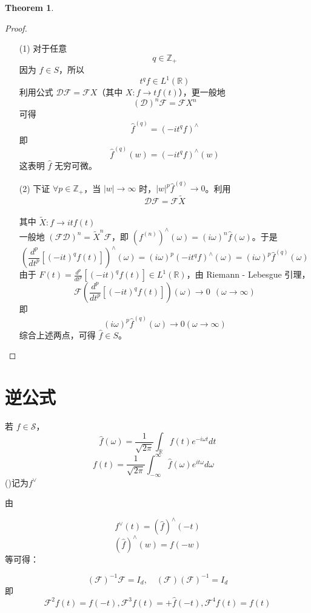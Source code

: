 \documentclass[linespread=1.5,openany]{book}%
\theoremstyle{plain}
\newtheorem{theorem}{Theorem}
\begin{document}
{\begin{theorem}
			\end{theorem}
			\begin{proof}
				\begin{itemize}	\item [(1)]对于任意 \[ q \in \mathbb{Z}_{+} \]因为 \( f \in S \)，所以 \[ t^{q}f \in L^{1}(\mathbb{R}) \]利用公式 \( \mathcal{D}\mathcal{F} = \mathcal{F}X \)（其中 \( X: f \to tf(t) \)），更一般地 \[ (\mathcal{D})^{n}\mathcal{F} = \mathcal{F}X^{n} \]可得 \[ \hat{f}^{(q)} = (-it^{q}f)^{\wedge} \]即
					\[ \hat{f}^{(q)}(w) = (-it^{q}f)^{\wedge}(w) \]
					这表明 \( \hat{f} \) 无穷可微。
					\item [(2)]	
					下证 \( \forall p \in \mathbb{Z}_{+} \)，当 \( |w| \to \infty \) 时，\( |w|^{p}\hat{f}^{(q)} \to 0 \)。利用 \[ \mathcal{D}\mathcal{F} = \mathcal{F}\tilde{X} \]\\其中 \( \tilde{X}: f \to itf(t) \)\\一般地 \( (\mathcal{F}\mathcal{D})^{n} = \tilde{X}^{n}\mathcal{F} \)，即 \( (f^{(n)})^{\wedge}(\omega) = (i\omega)^{n}\hat{f}(\omega) \)。于是 \[ \left( \frac{d^{p}}{dt^{p}}[(-it)^{q}f(t)] \right)^{\wedge}(\omega) = (i\omega)^{p}(-it^{q}f)^{\wedge}(\omega) = (i\omega)^{p}\hat{f}^{(q)}(\omega) \]
					由于 \( F(t)=\frac{d^{p}}{dt^{p}}[(-it)^{q}f(t)] \in L^{1}(\mathbb{R}) \)，由 Riemann - Lebesgue 引理，\[ \mathcal{F}\left( \frac{d^{p}}{dt^{p}}[(-it)^{q}f(t)] \right)(\omega) \to 0 \ \ (\omega \to \infty) \]即 \[ (i\omega)^{p}\hat{f}^{(q)}(\omega) \to 0( \omega \to \infty) \]综合上述两点，可得 \( \hat{f} \in S \)。
				\end{itemize}
			\end{proof}
			\section{逆公式}
			若 \( f \in 	\mathcal{S} \)，
			\[
			\hat{f}(\omega)=\frac{1}{\sqrt{2\pi}}\int_{\mathbb{R}} f(t)e^{-i\omega t}dt
			\]
			\[
			f(t)=\frac{1}{\sqrt{2\pi}}\int_{-\infty}^{\infty} \hat{f}(\omega)e^{i t \omega}d\omega \quad \]()记为$f^{\vee}$
			
			由\begin{center}
				\[f^{\vee}(t)=(\hat{f})^{\wedge}(-t) \] \[(\hat{f})^{\wedge}(w)=f(-w)\]等可得：
			\end{center}  
			\[
			(\mathcal{F})^{-1}\mathcal{F} =I_{d}, \quad (\mathcal{F} )(\mathcal{F} )^{-1}=I_{d}
			\]
			即 \[ \mathcal{F}^2 f(t)=f(-t),\mathcal{F}^3 f(t)= +\hat{f}(-t) , \mathcal{F}^4 f(t)=f(t) \]
}
\end{document}
